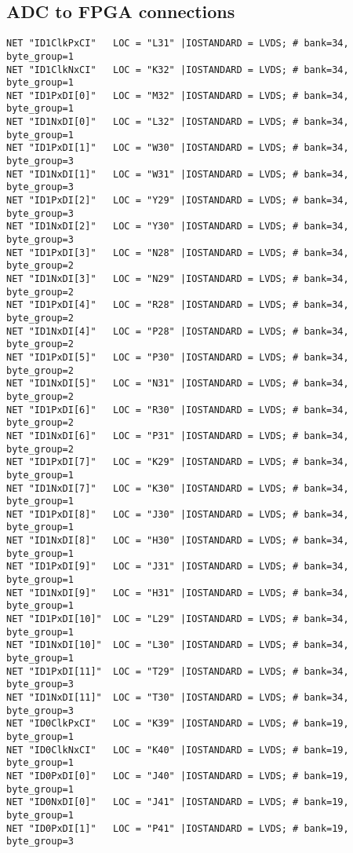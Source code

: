 \begin{appendix}
  \chapter{ADC to FPGA connections}
\label{app:app_adc_fpga_con}
\begin{verbatim}
NET "ID1ClkPxCI"   LOC = "L31" |IOSTANDARD = LVDS; # bank=34, byte_group=1
NET "ID1ClkNxCI"   LOC = "K32" |IOSTANDARD = LVDS; # bank=34, byte_group=1
NET "ID1PxDI[0]"   LOC = "M32" |IOSTANDARD = LVDS; # bank=34, byte_group=1
NET "ID1NxDI[0]"   LOC = "L32" |IOSTANDARD = LVDS; # bank=34, byte_group=1
NET "ID1PxDI[1]"   LOC = "W30" |IOSTANDARD = LVDS; # bank=34, byte_group=3
NET "ID1NxDI[1]"   LOC = "W31" |IOSTANDARD = LVDS; # bank=34, byte_group=3
NET "ID1PxDI[2]"   LOC = "Y29" |IOSTANDARD = LVDS; # bank=34, byte_group=3
NET "ID1NxDI[2]"   LOC = "Y30" |IOSTANDARD = LVDS; # bank=34, byte_group=3
NET "ID1PxDI[3]"   LOC = "N28" |IOSTANDARD = LVDS; # bank=34, byte_group=2
NET "ID1NxDI[3]"   LOC = "N29" |IOSTANDARD = LVDS; # bank=34, byte_group=2
NET "ID1PxDI[4]"   LOC = "R28" |IOSTANDARD = LVDS; # bank=34, byte_group=2
NET "ID1NxDI[4]"   LOC = "P28" |IOSTANDARD = LVDS; # bank=34, byte_group=2
NET "ID1PxDI[5]"   LOC = "P30" |IOSTANDARD = LVDS; # bank=34, byte_group=2
NET "ID1NxDI[5]"   LOC = "N31" |IOSTANDARD = LVDS; # bank=34, byte_group=2
NET "ID1PxDI[6]"   LOC = "R30" |IOSTANDARD = LVDS; # bank=34, byte_group=2
NET "ID1NxDI[6]"   LOC = "P31" |IOSTANDARD = LVDS; # bank=34, byte_group=2
NET "ID1PxDI[7]"   LOC = "K29" |IOSTANDARD = LVDS; # bank=34, byte_group=1
NET "ID1NxDI[7]"   LOC = "K30" |IOSTANDARD = LVDS; # bank=34, byte_group=1
NET "ID1PxDI[8]"   LOC = "J30" |IOSTANDARD = LVDS; # bank=34, byte_group=1
NET "ID1NxDI[8]"   LOC = "H30" |IOSTANDARD = LVDS; # bank=34, byte_group=1
NET "ID1PxDI[9]"   LOC = "J31" |IOSTANDARD = LVDS; # bank=34, byte_group=1
NET "ID1NxDI[9]"   LOC = "H31" |IOSTANDARD = LVDS; # bank=34, byte_group=1
NET "ID1PxDI[10]"  LOC = "L29" |IOSTANDARD = LVDS; # bank=34, byte_group=1
NET "ID1NxDI[10]"  LOC = "L30" |IOSTANDARD = LVDS; # bank=34, byte_group=1
NET "ID1PxDI[11]"  LOC = "T29" |IOSTANDARD = LVDS; # bank=34, byte_group=3
NET "ID1NxDI[11]"  LOC = "T30" |IOSTANDARD = LVDS; # bank=34, byte_group=3
NET "ID0ClkPxCI"   LOC = "K39" |IOSTANDARD = LVDS; # bank=19, byte_group=1
NET "ID0ClkNxCI"   LOC = "K40" |IOSTANDARD = LVDS; # bank=19, byte_group=1
NET "ID0PxDI[0]"   LOC = "J40" |IOSTANDARD = LVDS; # bank=19, byte_group=1
NET "ID0NxDI[0]"   LOC = "J41" |IOSTANDARD = LVDS; # bank=19, byte_group=1
NET "ID0PxDI[1]"   LOC = "P41" |IOSTANDARD = LVDS; # bank=19, byte_group=3

\end{verbatim}
\end{appendix}
